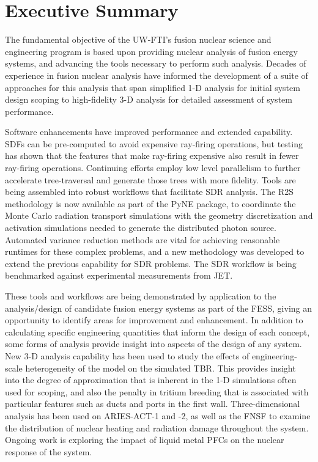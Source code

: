\chapter{Executive Summary}


The fundamental objective of the \gls{UW-FTI}'s fusion nuclear science and
engineering program is based upon providing nuclear analysis of fusion energy
systems, and advancing the tools necessary to perform such analysis.  Decades
of experience in fusion nuclear analysis have informed the development of a
suite of approaches for this analysis that span simplified 1-D analysis for
initial system design scoping to high-fidelity 3-D analysis for detailed
assessment of system performance.

Software enhancements have improved performance and extended capability.
\glspl{SDF} can be pre-computed to avoid expensive ray-firing operations, but
testing has shown that the features that make ray-firing expensive also result
in fewer ray-firing operations.  Continuing efforts employ low level
parallelism to further accelerate tree-traversal and generate those trees with
more fidelity.  Tools are being assembled into robust workflows that
facilitate \gls{SDR} analysis.  The \gls{R2S} methodology is now available as part of
the PyNE package, to coordinate the Monte Carlo radiation transport
simulations with the geometry discretization and activation simulations needed
to generate the distributed photon source.  Automated variance reduction
methods are vital for achieving reasonable runtimes for these complex
problems, and a new methodology was developed to extend the previous
capability for \gls{SDR} problems. The \gls{SDR} workflow is being benchmarked
against experimental measurements from JET.

These tools and workflows are being demonstrated by application to the
analysis/design of candidate fusion energy systems as part of the \gls{FESS},
giving an opportunity to identify areas for improvement and enhancement.  In
addition to calculating specific engineering quantities that inform the design
of each concept, some forms of analysis provide insight into aspects of the
design of any system.  New 3-D analysis capability has been used to study the
effects of engineering-scale heterogeneity of the model on the simulated
\gls{TBR}. This provides insight into the degree of approximation that is
inherent in the 1-D simulations often used for scoping, and also the penalty
in tritium breeding that is associated with particular features such as ducts
and ports in the first wall.  Three-dimensional analysis has been used on
ARIES-ACT-1 and -2, as well as the \gls{FNSF} to examine the distribution of
nuclear heating and radiation damage throughout the system.  Ongoing work is
exploring the impact of liquid metal \glspl{PFC} on the nuclear response of
the system.

